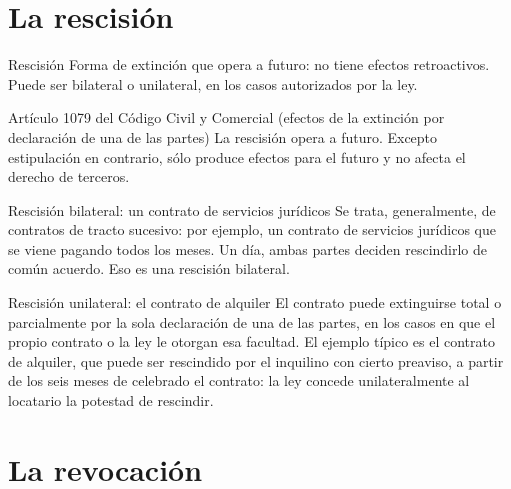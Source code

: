 \documentclass[12pt,oneside]{book}
\begin{document}
\section{La rescisión}

\begin{definition}{Rescisión}
Forma de extinción que opera a futuro: no tiene efectos retroactivos. Puede ser bilateral o unilateral, en los casos autorizados por la ley.
\end{definition}

\begin{articulo}{Artículo 1079 del Código Civil y Comercial (efectos de la extinción por declaración de una de las partes)}
La rescisión opera a futuro. Excepto estipulación en contrario, sólo produce efectos para el futuro y no afecta el derecho de terceros.
\end{articulo}

\begin{example}{Rescisión bilateral: un contrato de servicios jurídicos}
Se trata, generalmente, de contratos de tracto sucesivo: por ejemplo, un contrato de servicios jurídicos que se viene pagando todos los meses. Un día, ambas partes deciden rescindirlo de común acuerdo. Eso es una rescisión bilateral.
\end{example}

\begin{example}{Rescisión unilateral: el contrato de alquiler}
El contrato puede extinguirse total o parcialmente por la sola declaración de una de las partes, en los casos en que el propio contrato o la ley le otorgan esa facultad. El ejemplo típico es el contrato de alquiler, que puede ser rescindido por el inquilino con cierto preaviso, a partir de los seis meses de celebrado el contrato: la ley concede unilateralmente al locatario la potestad de rescindir.
\end{example}

\section{La revocación}
\end{document}
